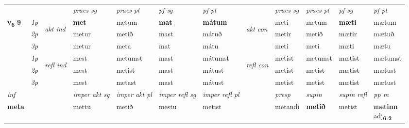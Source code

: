 \begin{longtable}[l]{X>{\footnotesize\itshape}llXXXXlXXXX}
\midrule

 & &   & \textit{praes sg}  & \textit{praes pl}    & \textit{ pf sg} & \textit{pf pl} & & \textit{praes sg}  & \textit{praes pl}    & \textit{pf sg} & \textit{pf pl }  \\ \cmidrule{4-7} \cmidrule{9-12}
 \multirow{2}{*}{{{\textbf{v{\textsubscript{6}}} \Large{\textbf{9}}}}}  & 1p & \multirow{3}{*}{\begin{turn}{90}\textit{akt ind}\end{turn}} & \textbf{met} & metum & \textbf{mat} & \textbf{mátum} & \multirow{3}{*}{\begin{turn}{90}\textit{akt con}\end{turn}} &meti & metum & \textbf{mæti} & mætum\\*
 & 2p &  &  metur  & metið & mast & mátuð & & metir & metið & mætir & mætuð \\*
 & 3p &  & metur & meta & mat & mátu & & meti & meti& mæti & mætu \\*
\cmidrule{4-7} \cmidrule{9-12}
 & 1p & \multirow{3}{*}{\begin{turn}{90}\textit{refl ind}\end{turn}}  & mest & metumst & mast & mátumst & \multirow{3}{*}{\begin{turn}{90}\textit{refl con}\end{turn}}  &metist & metumst & mætist & mætumst \\*
 & 2p &  & mest & metist & mast & mátust & &metist & metist & mætist & mætust \\*
 & 3p  & & mest & metast & mast & mátust & & metist & metist& mætist & mætust \\*
\cmidrule{4-7} \cmidrule{9-12}

   {\textit{inf}} & &  & \textit{imper akt sg} & \textit{imper akt pl} & \textit{imper refl sg} & \textit{imper refl pl} && \textit{presp} & \textit{supin} & \textit{supin refl} & \textit{pp m} \\*
  {\textbf{meta}} & && mettu  & metið & mestu & metist && metandi &  \textbf{metið} & metist & \specialcell{\textbf{metinn} \\ adj\textbf{\textsubscript{6-2}}} \\*

\midrule


\end{longtable}
